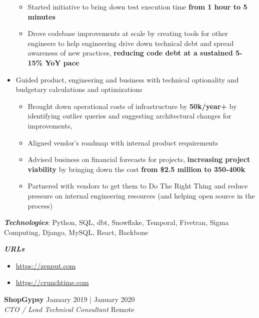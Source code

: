 \documentclass[a4paper]{article}
\newenvironment{jobdetails}%
    {\list{}{\leftmargin=4mm}\item[]}%
    {\endlist}
\begin{document}
\begin{jobdetails}
\begin{itemize}
\begin{itemize}
            \item Started initiative to bring down test execution time \textbf{from 1 hour to 5 minutes}
            \item Drove codebase improvements at scale by creating tools for other engineers to help engineering drive down technical debt and spread awareness of new practices, \textbf{reducing code debt at a sustained 5-15\% YoY pace}
        \end{itemize}
    \item Guided product, engineering and business with technical optionality and budgetary calculations and optimizations
        \begin{itemize}
            \item Brought down operational costs of infrastructure by \textbf{50k/year+} by identifying outlier queries and suggesting architectural changes for improvements,
            \item Aligned vendor's roadmap with internal product requirements
            \item Advised business on financial forecasts for projects, \textbf{increasing project viability} by bringing down the cost \textbf{from \$2.5 million to 350-400k}
            \item Partnered with vendors to get them to Do The Right Thing and reduce pressure on internal engineering resources (and helping open source in the process)
        \end{itemize}
\end{itemize}
\vspace{2mm}

\textbf{\textit{Technologies}}: Python, SQL, dbt, Snowflake, Temporal, Fivetran, Sigma Computing, Django, MySQL, React, Backbone

\textbf{\textit{URLs}}
\begin{itemize} \itemsep 1pt
	\item \url{https://zenput.com}
	\item \url{https://crunchtime.com}
\end{itemize}

\end{jobdetails}
\vspace{1mm}


\pagebreak




\textbf{ShopGypsy} \hfill January 2019 | January 2020 \\
\textit{CTO / Lead Technical Consultant} \hfill Remote \\
\vspace{2mm}
\end{document}
